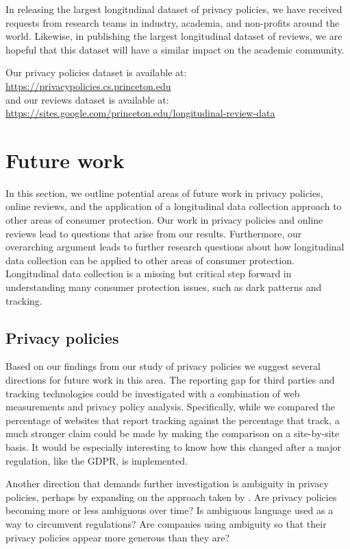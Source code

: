 In releasing the largest longitudinal dataset of privacy policies, we have received \policyrequests~ requests from research teams in industry, academia, and non-profits around the world. Likewise, in publishing the largest longitudinal dataset of reviews, we are hopeful that this dataset will have a similar impact on the academic community.

Our privacy policies dataset is available at:\\
\indent \url{https://privacypolicies.cs.princeton.edu}\\
and our reviews dataset is available at:\\
\indent \url{https://sites.google.com/princeton.edu/longitudinal-review-data}

\section{Future work} \label{sec:conclusion:futurework}

In this section, we outline potential areas of future work in privacy policies, online reviews, and the application of a longitudinal data collection approach to other areas of consumer protection. Our work in privacy policies and online reviews lead to questions that arise from our results. Furthermore, our overarching argument leads to further research questions about how longitudinal data collection can be applied to other areas of consumer protection. Longitudinal data collection is a missing but critical step forward in understanding many consumer protection issues, such as dark patterns and tracking.

\subsection{Privacy policies} \label{subsec:conclusion:privacypolicies}
Based on our findings from our study of privacy policies we suggest several directions for future work in this area. The reporting gap for third parties and tracking technologies could be investigated with a combination of web measurements and privacy policy analysis. Specifically, while we compared the percentage of websites that report tracking against the percentage that track, a much stronger claim could be made by making the comparison on a site-by-site basis. It would be especially interesting to know how this changed after a major regulation, like the GDPR, is implemented.

Another direction that demands further investigation is ambiguity in privacy policies, perhaps by expanding on the approach taken by \citet{reidenberg2016ambiguity}. Are privacy policies becoming more or less ambiguous over time? Is ambiguous language used as a way to circumvent regulations? Are companies using ambiguity so that their privacy policies appear more generous than they are?

